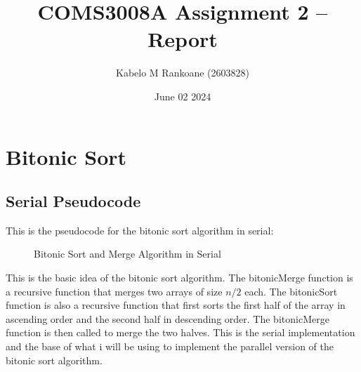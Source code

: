

\title{COMS3008A Assignment 2 -- Report}
\author{Kabelo M Rankoane (2603828)}
\date{June 02 2024}
\maketitle
\pagestyle{fancy}
\fancyhf{}
\fancyhead[R]{\thepage}
{}
\section{Bitonic Sort}

\subsection*{Serial Pseudocode}
This is the pseudocode for the bitonic sort algorithm in serial:\\
\begin{figure}[ht]
    \begin{algorithm2e}
    \end{algorithm2e}
    \caption{Bitonic Sort and Merge Algorithm in Serial}
    \label{fig:bitonic}
\end{figure}
This is the basic idea of the bitonic sort algorithm. The bitonicMerge function
is a recursive function that merges two arrays of size $n/2$ each. The
bitonicSort function is also a recursive function that first sorts the first
half of the array in ascending order and the second half in descending order.
The bitonicMerge function is then called to merge the two halves.
This is the serial implementation and the base of what i will be using to
implement the parallel version of the bitonic sort algorithm.

